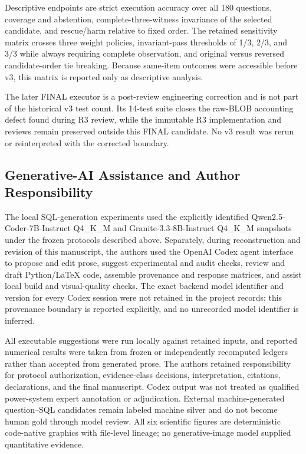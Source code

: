 \documentclass[applsci,article,submit,moreauthors]{Definitions/mdpi}
\begin{document}
Descriptive endpoints are strict execution accuracy over all 180 questions, coverage and abstention, complete-three-witness invariance of the selected candidate, and rescue/harm relative to fixed order. The retained sensitivity matrix crosses three weight policies, invariant-pass thresholds of 1/3, 2/3, and 3/3 while always requiring complete observation, and original versus reversed candidate-order tie breaking. Because same-item outcomes were accessible before v3, this matrix is reported only as descriptive analysis.

The later FINAL executor is a post-review engineering correction and is not part of the historical v3 test count. Its 14-test suite closes the raw-BLOB accounting defect found during R3 review, while the immutable R3 implementation and reviews remain preserved outside this FINAL candidate. No v3 result was rerun or reinterpreted with the corrected boundary.

\subsection{Generative-AI Assistance and Author Responsibility}

The local SQL-generation experiments used the explicitly identified Qwen2.5-Coder-7B-Instruct Q4\_K\_M and Granite-3.3-8B-Instruct Q4\_K\_M snapshots under the frozen protocols described above. Separately, during reconstruction and revision of this manuscript, the authors used the OpenAI Codex agent interface to propose and edit prose, suggest experimental and audit checks, review and draft Python/\LaTeX{} code, assemble provenance and response matrices, and assist local build and visual-quality checks. The exact backend model identifier and version for every Codex session were not retained in the project records; this provenance boundary is reported explicitly, and no unrecorded model identifier is inferred.

All executable suggestions were run locally against retained inputs, and reported numerical results were taken from frozen or independently recomputed ledgers rather than accepted from generated prose. The authors retained responsibility for protocol authorization, evidence-class decisions, interpretation, citations, declarations, and the final manuscript. Codex output was not treated as qualified power-system expert annotation or adjudication. External machine-generated question--SQL candidates remain labeled machine silver and do not become human gold through model review. All six scientific figures are deterministic code-native graphics with file-level lineage; no generative-image model supplied quantitative evidence.
\end{document}
